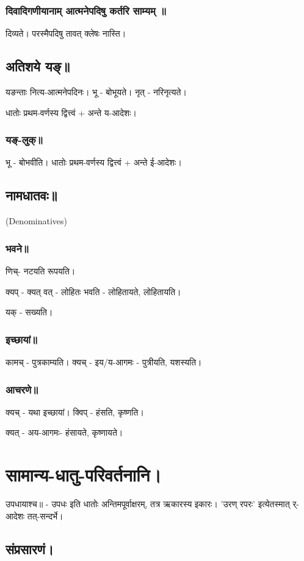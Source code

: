 \documentclass[oneside, article]{memoir}
\begin{document}
\subsubsection{दिवादिगणीयानाम् आत्मनेपदिषु कर्तरि साम्यम् ॥}
दिव्यते। परस्मैपदिषु तावत् क्लेषः नास्ति।

\subsection{अतिशये यङ्॥}
यङन्ताः नित्य-आत्मनेपदिनः। भू - बोभूयते। नृत् - नरिनृत्यते।

धातोः प्रथम-वर्णस्य द्वित्त्वं + अन्ते य-आदेशः।

\subsubsection{यङ्-लुक्॥}
भू - बोभवीति। धातोः प्रथम-वर्णस्य द्वित्त्वं + अन्ते ई-आदेशः।

\subsection{नामधातवः॥}
(Denominatives)

\subsubsection{भवने॥}
णिच्- नटयति रूपयति।

क्यप् - क्यत् वत् - लोहितः भवति - लोहितायते, लोहितायति।

यक् - सख्यति।

\subsubsection{इच्छायां॥}
कामच् - पुत्रकाम्यति। क्यच् - इय/य-आगमः - पुत्रीयति, यशस्यति।

\subsubsection{आचरणे॥}
क्यच् - यथा इच्छायां। क्विप् - हंसति, कृष्णति।

क्यत् - अय-आगमः- हंसायते, कृष्णायते।

\section{सामान्य-धातु-परिवर्तनानि।}
उपधायाश्च॥ - उपधः इति धातोः अन्तिमपूर्वाक्षरम्, तत्र ऋकारस्य इकारः। 'उरण् रपरः' इत्येतस्मात् र्-आदेशः तत्-सन्दर्भे। \tbc

\subsection{संप्रसारणं।}
\end{document}
